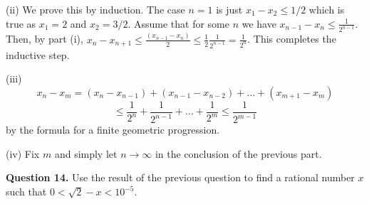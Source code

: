 \documentclass[12pt]{article}
\begin{document}
(ii) We prove this by induction. The case $n=1$ is just $x_1 - x_2 \leq 1/2$ which is true as $x_1 = 2$ and $x_2 = 3/2$. Assume that for some $n$ we have $x_{n-1} - x_{n} \leq \frac{1}{2^{n-1}}$. Then, by part (i), 
$x_n - x_{n+1} \leq \frac{(x_{n-1} - x_{n})}{2} \leq \frac{1}{2} \frac{1}{2^{n-1}} = \frac{1}{2^{n}}$. This completes the inductive step.

(iii) \[x_n - x_m = (x_n - x_{n-1}) + (x_{n-1} - x_{n-2}) + \dots + (x_{m+1} - x_m) \]
\[ \leq \frac{1}{2^n} + \frac{1}{2^{n-1}} + \dots + \frac{1}{2^m} \leq 
\frac{1}{2^{m-1}}\]
by the formula for a finite geometric progression.

(iv) Fix $m$ and simply let $n \to \infty$ in the conclusion of the previous part.

\bigskip
\noindent
{\bf Question 14.} Use the result of the previous question 
to find a rational number $x$ such that $0 < \sqrt{2} - x < 10^{-5}$.
\end{document}
